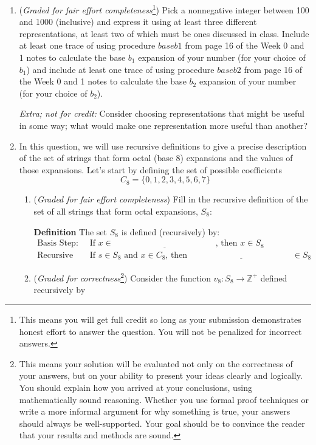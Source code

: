 \begin{enumerate}
    \item ({\it Graded for fair effort completeness}\footnote{This means 
    you will get full credit so long as your submission demonstrates honest 
    effort to answer the question. You will not be penalized for incorrect answers.})
    Pick a nonnegative integer between 100 and 1000 (inclusive) and express it using at 
    least three different representations, 
    at least two of which must be ones discussed in class. Include at least one
    trace of using procedure $baseb1$ from page 16 of the Week 0 and 1 notes
    to calculate the base $b_1$ expansion of your
    number (for your choice of $b_1$) and include at least one trace of using 
    procedure $baseb2$ from page 16 of the Week 0 and 1 notes
    to calculate the base $b_2$ expansion of your number
    (for your choice of $b_2$). 
    
    {\it Extra; not for credit:} Consider choosing representations that might be useful in 
    some way; what would make one representation more useful than another?

    \newpage
    \item In this question, we will use recursive definitions to give a precise description 
    of the set of strings that form octal (base $8$) expansions and the values
    of those expansions. Let's start by defining the set of possible coefficients
    \[
        C_8 = \{ 0, 1, 2, 3, 4, 5, 6, 7\}
    \]

    \begin{enumerate}
    \item ({\it Graded for fair effort completeness}) Fill in the recursive definition of the 
    set of all strings that form octal expansions, $S_8$: 
    
    {\bf Definition} The set $S_8$ is defined (recursively) by:
    \[
    \begin{array}{ll}
    \textrm{Basis Step: } & \textrm{If } x \in \underline{\phantom{\hspace{2in}}} \textrm{, then } x \in S_8\\
    \textrm{Recursive Step: } & \textrm{If } s \in S_8 \textrm{ and } x \in C_8 \textrm{, then }
    \underline{\phantom{\hspace{2in}}} \in S_8
    \end{array}
    \]
    
    \item  ({\it Graded for correctness}\footnote{This means your solution will be
    evaluated not only on the correctness of your answers, but on your ability to 
    present your ideas clearly and logically. You should explain how you arrived at 
    your conclusions, using 
    mathematically sound reasoning. Whether you use formal proof techniques or 
    write a more informal argument for why 
    something is true, your answers should always be well-supported. Your goal 
    should be to convince the reader that 
    your results and methods are sound.})
    Consider the function $v_8: S_8 \to \mathbb{Z}^+$ defined recursively by 
    

\end{enumerate}
\end{enumerate}
